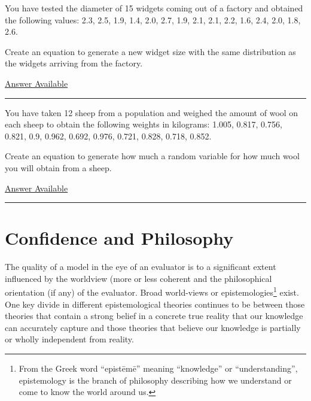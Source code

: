 \documentclass[]{memoir}
\begin{document}

You have tested the diameter of 15 widgets coming out of a factory and
obtained the following values: 2.3, 2.5, 1.9, 1.4, 2.0, 2.7, 1.9, 2.1,
2.1, 2.2, 1.6, 2.4, 2.0, 1.8, 2.6.

Create an equation to generate a new widget size with the same
distribution as the widgets arriving from the factory.

\hyperref[Ans-8-5]{Answer Available}

\begin{center}\rule{3in}{0.4pt}\end{center}


You have taken 12 sheep from a population and weighed the amount of wool
on each sheep to obtain the following weights in kilograms: 1.005,
0.817, 0.756, 0.821, 0.9, 0.962, 0.692, 0.976, 0.721, 0.828, 0.718,
0.852.

Create an equation to generate how much a random variable for how much
wool you will obtain from a sheep.

\hyperref[Ans-8-6]{Answer Available}

\begin{center}\rule{3in}{0.4pt}\end{center}

\section{Confidence and Philosophy}

The quality of a model in the eye of an evaluator is to a significant
extent influenced by the worldview (more or less coherent and the
philosophical orientation (if any) of the evaluator. Broad world-views
or epistemologies\footnote{From the Greek word ``epistēmē'' meaning
  ``knowledge'' or ``understanding'', epistemology is the branch of
  philosophy describing how we understand or come to know the world
  around us.} exist. One key divide in different epistemological
theories continues to be between those theories that contain a strong
belief in a concrete true reality that our knowledge can accurately
capture and those theories that believe our knowledge is partially or
wholly independent from reality.
\end{document}
